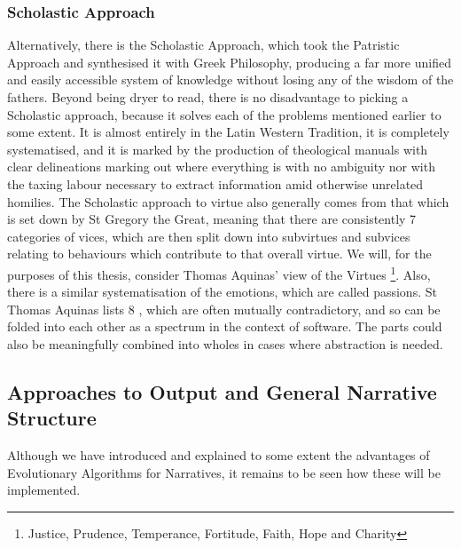 \documentclass[11pt]{article}
\begin{document}
\subsubsection{Scholastic Approach} 
Alternatively, there is the Scholastic Approach, which took the Patristic Approach and synthesised it with Greek Philosophy, producing a far more unified and easily accessible system of knowledge without losing any of the wisdom of the fathers. Beyond being dryer to read, there is no disadvantage to picking a Scholastic approach, because it solves each of the problems mentioned earlier to some extent. It is almost entirely in the Latin Western Tradition, it is completely systematised, and it is marked by the production of theological manuals with clear delineations marking out where everything is with no ambiguity nor with the taxing labour necessary to extract information amid otherwise unrelated homilies. The Scholastic approach to virtue also generally comes from that which is set down by St Gregory the Great, meaning that there are consistently 7 categories of vices, which are then split down into subvirtues and subvices relating to behaviours which contribute to that overall virtue. We will, for the purposes of this thesis, consider Thomas Aquinas' view of the Virtues \footnote{Justice, Prudence, Temperance, Fortitude, Faith, Hope and Charity}. Also, there is a similar systematisation of the emotions, which are called passions. St Thomas Aquinas lists 8 \cite{ThomasAq85:online}, which are often mutually contradictory, and so can be folded into each other as a spectrum in the context of software. The parts could also be meaningfully combined into wholes in cases where abstraction is needed.
\subsection{Approaches to Output and General Narrative Structure}
Although we have introduced and explained to some extent the advantages of Evolutionary Algorithms for Narratives, it remains to be seen how these will be implemented. 
\end{document}

